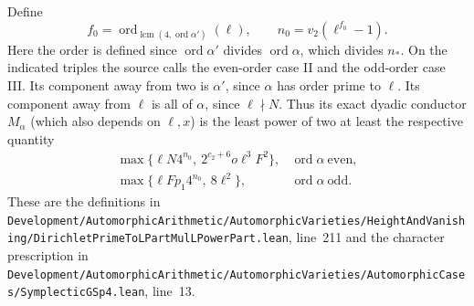 \documentclass[a4paper,11pt]{article}
\theoremstyle{definition}
\theoremstyle{remark}
\newcommand{\srcloc}[2]{{\small\nolinkurl{#1.lean}}, line~#2}
\numberwithin{equation}{section}
\begin{document}
Define
\[
 f_0=\operatorname{ord}_{\operatorname{lcm}(4,\operatorname{ord}\alpha')}
                  (\ell),\qquad n_0=v_2(\ell^{f_0}-1).
\]
Here the order is defined since \(\operatorname{ord}\alpha'\)
divides \(\operatorname{ord}\alpha\), which divides \(n_*\).
On the indicated triples the source calls the even-order case
II and the odd-order case III. Its component away from two
is \(\alpha'\), since \(\alpha\) has order prime to \(\ell\).
Its component away from \(\ell\) is all of \(\alpha\), since
\(\ell\nmid N\). Thus its exact dyadic conductor \(M_\alpha\)
(which also depends on \(\ell,x\)) is the least power of two
at least the respective quantity
\[
\begin{array}{ll}
 \max\{\ell N4^{n_0},\ 2^{c_2+6}o\ell^3 F^2\},
       &\operatorname{ord}\alpha\ \text{even},\\[2pt]
 \max\{\ell Fp_1 4^{n_0},\ 8\ell^2\},
       &\operatorname{ord}\alpha\ \text{odd}.
\end{array}
\]
These are the definitions in
\srcloc{Development/AutomorphicArithmetic/AutomorphicVarieties/HeightAndVanishing/DirichletPrimeToLPartMulLPowerPart}{211}
and the character prescription in
\srcloc{Development/AutomorphicArithmetic/AutomorphicVarieties/AutomorphicCases/SymplecticGSp4}{13}.
\end{document}
